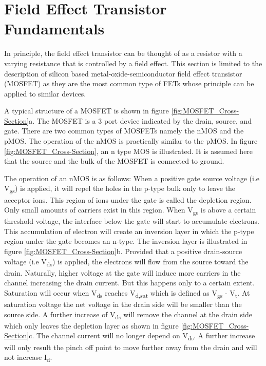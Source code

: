 \documentclass[11pt,a4paper]{report}
\begin{document}
\section{Field Effect Transistor Fundamentals}
 In principle, the field effect transistor can be thought of as a resistor with a varying resistance that is controlled by a field effect. This section is limited to the description of silicon based metal-oxide-semiconductor field effect transistor (MOSFET) as they are the most common type of FETs whose principle can be applied to similar devices.


A typical structure of a MOSFET is shown in figure \ref{fig:MOSFET_Cross-Section}a. The MOSFET is a 3 port device indicated by the drain, source, and gate. There are two common types of MOSFETs namely the nMOS and the pMOS. The operation of the nMOS is practically similar to the pMOS. In figure \ref{fig:MOSFET_Cross-Section}, an n type MOS is illustrated. It is assumed here that the source and the bulk of the MOSFET is connected to ground. 

The operation of an nMOS is as follows: When a positive gate source voltage (i.e V\textsubscript{gs}) is applied, it will repel the holes in the p-type bulk only to leave the acceptor ions. This region of ions under the gate is called the depletion region. Only small amounts of carriers exist in this region. When V\textsubscript{gs} is above a certain threshold voltage, the interface below the gate will start to accumulate electrons. This accumulation of electron will create an inversion layer in which the p-type region under the gate becomes an n-type. The inversion layer is illustrated in figure \ref{fig:MOSFET_Cross-Section}b. Provided that a positive drain-source voltage (i.e V\textsubscript{ds}) is applied, the electrons will flow from the source toward the drain. Naturally, higher voltage at the gate will induce more carriers in the channel increasing the drain current. But this happens only to a certain extent. Saturation will occur when V\textsubscript{ds} reaches V\textsubscript{d,sat} which is defined as V\textsubscript{gs} - V\textsubscript{t}. At saturation voltage the net voltage in the drain side will be smaller than the source side. A further increase of V\textsubscript{ds} will remove the channel at the drain side which only leaves the depletion layer as shown in figure \ref{fig:MOSFET_Cross-Section}c. The channel current will no longer depend on V\textsubscript{ds}. A further increase will only result the pinch off point to move further away from the drain and will not increase I\textsubscript{d}.
\end{document}
